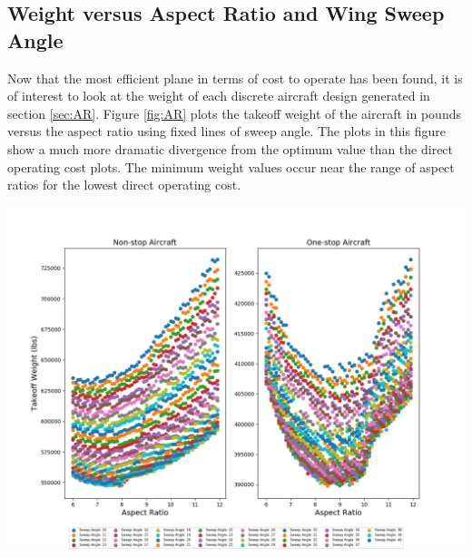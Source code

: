 \documentclass{article}
\begin{document}
    \subsection{Weight versus Aspect Ratio and Wing Sweep Angle}
    \label{sec:weight}
        \begin{flushleft}
            Now that the most efficient plane in terms of cost to operate has
            been found, it is of interest to look at the weight of each discrete
            aircraft design generated in section \ref{sec:AR}. Figure
            \ref{fig:AR} plots the takeoff weight of the aircraft in pounds
            versus the aspect ratio using fixed lines of sweep angle. The plots
            in this figure show a much more dramatic divergence from the optimum
            value than the direct operating cost plots. The minimum weight
            values occur near the range of aspect ratios for the lowest direct
            operating cost.
        \end{flushleft}

        \begin{center}
            \includegraphics[scale=0.5]{Weight v Sweep Angle.PNG}
            \label{fig:AR}
        \end{center}

\end{document}
